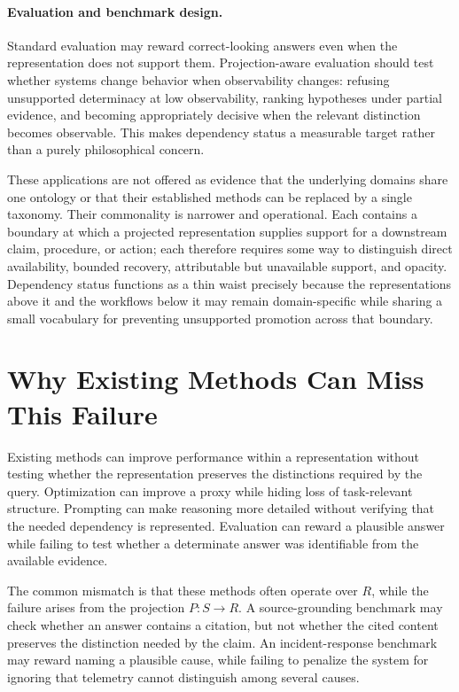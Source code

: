 \documentclass[11pt]{article}
\theoremstyle{definition}
\theoremstyle{remark}
\begin{document}
\paragraph{Evaluation and benchmark design.}
Standard evaluation may reward correct-looking answers even when the representation does not support them. Projection-aware evaluation should test whether systems change behavior when observability changes: refusing unsupported determinacy at low observability, ranking hypotheses under partial evidence, and becoming appropriately decisive when the relevant distinction becomes observable. This makes dependency status a measurable target rather than a purely philosophical concern.

These applications are not offered as evidence that the underlying domains share one ontology or that their established methods can be replaced by a single taxonomy. Their commonality is narrower and operational. Each contains a boundary at which a projected representation supplies support for a downstream claim, procedure, or action; each therefore requires some way to distinguish direct availability, bounded recovery, attributable but unavailable support, and opacity. Dependency status functions as a thin waist precisely because the representations above it and the workflows below it may remain domain-specific while sharing a small vocabulary for preventing unsupported promotion across that boundary.

\section{Why Existing Methods Can Miss This Failure}

Existing methods can improve performance within a representation without testing whether the representation preserves the distinctions required by the query. Optimization can improve a proxy while hiding loss of task-relevant structure. Prompting can make reasoning more detailed without verifying that the needed dependency is represented. Evaluation can reward a plausible answer while failing to test whether a determinate answer was identifiable from the available evidence.

The common mismatch is that these methods often operate over $R$, while the failure arises from the projection $P:S\rightarrow R$. A source-grounding benchmark may check whether an answer contains a citation, but not whether the cited content preserves the distinction needed by the claim. An incident-response benchmark may reward naming a plausible cause, while failing to penalize the system for ignoring that telemetry cannot distinguish among several causes.
\end{document}
